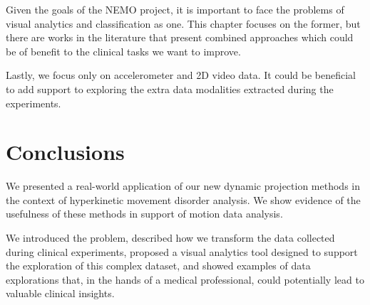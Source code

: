 Given the goals of the NEMO project, it is important to face the problems of visual analytics and classification as one. This chapter focuses on the former, but there are works in the literature that present combined approaches \citep{Graving2020.07.17.207993,rauber_aid} which could be of benefit to the clinical tasks we want to improve. 

Lastly, we focus only on accelerometer and 2D video data. It could be beneficial to add support to exploring the extra data modalities extracted during the experiments.


\section{Conclusions}

We presented a real-world application of our new dynamic projection methods in the context of hyperkinetic movement disorder analysis. We show evidence of the usefulness of these methods in support of motion data analysis.

We introduced the problem, described how we transform the data collected during clinical experiments, proposed a visual analytics tool designed to support the exploration of this complex dataset, and showed examples of data explorations that, in the hands of a medical professional, could potentially lead to valuable clinical insights.

